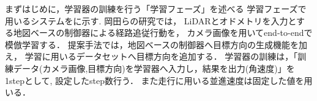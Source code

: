 \documentclass[10pt]{jarticle}
\begin{document}
    まずはじめに，学習器の訓練を行う「学習フェーズ」を述べる
    学習フェーズで用いるシステムをに示す.
    岡田らの研究では，
    LiDARとオドメトリを入力とする地図ベースの制御器による経路追従行動を，
    カメラ画像を用いてend-to-endで模倣学習する．
    提案手法では，地図ベースの制御器へ目標方向の生成機能を加え，
    学習に用いるデータセットへ目標方向を追加する．
    学習器の訓練は，「訓練データ(カメラ画像,目標方向)を学習器へ入力し，結果を出力(角速度)」を1stepとして,
    設定したstep数行う．
    また走行に用いる並進速度は固定した値を用いる．
\end{document}
